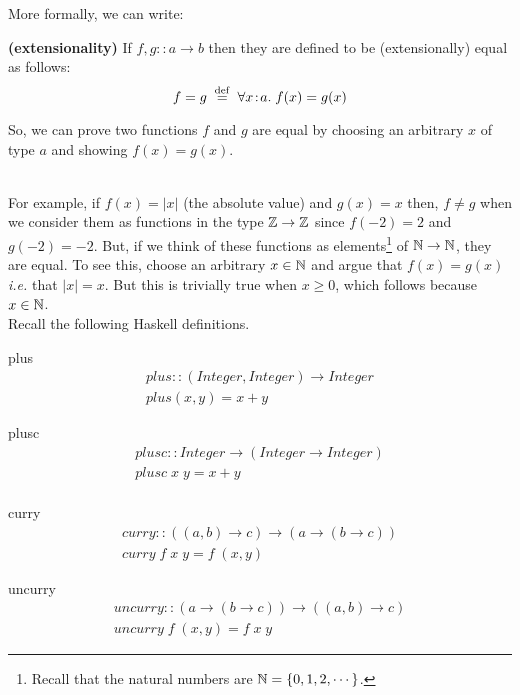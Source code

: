 \documentclass[11pt]{article}
\begin{document}
More formally, we can write:
\begin{definition}{{\bf{(extensionality)}}}
If $f,g::a\rightarrow{}b$ then they are defined to be (extensionally) equal as follows:
\[ f = g \; \;{\stackrel{\rm def}{=}}\;\; \forall{}x\!:\!a.\; f(x) = g(x) \]
\end{definition}

So, we can prove two functions $f$ and $g$ are equal by choosing an arbitrary
$x$ of type $a$ and showing $f(x) = g(x)$.

\ \\ For example, if $f(x) = |x|$ (the absolute value) and $g(x) = x$ then,
$f\not={}g$ when we consider them as functions in the type ${\mathbb{Z}} \rightarrow
{\mathbb{Z}}$ since $f(-2) = 2$ and $g(-2)=-2$.  But, if we think of these functions as
elements\footnote{Recall that the natural numbers are
${\mathbb{N}}=\{0,1,2,\cdots\}$.} of ${\mathbb{N}}\rightarrow{\mathbb{N}}$, they are equal.  To see
this, choose an arbitrary $x\in{\mathbb{N}}$ and argue that $f(x) = g(x)$ {\em{i.e.}}
that $|x|=x$.  But this is trivially true when $x \ge 0$, which follows because
$x\in{\mathbb{N}}$.  \ \\

Recall the following Haskell definitions.
\begin{definition}{plus}
\[\begin{array}{l}
plus :: (Integer,Integer) \rightarrow Integer \\
plus(x,y) = x + y 
\end{array}\]
\end{definition}


\begin{definition}{plusc}
\[\begin{array}{l}
plusc :: Integer \rightarrow (Integer \rightarrow Integer) \\
plusc \; x \; y = x + y \\
\end{array}\]
\end{definition}

\begin{definition}{curry}
\[\begin{array}{l}
curry :: ((a,b) \rightarrow c) \rightarrow (a \rightarrow (b \rightarrow c))\\
curry\; f\; x\; y = f\; (x,y) 
\end{array}\]
\end{definition}

\begin{definition}{uncurry}
\[\begin{array}{l}
uncurry :: (a \rightarrow (b \rightarrow c)) \rightarrow ((a,b) \rightarrow c) \\
uncurry \;f\; (x,y) = f\; x\; y 
\end{array}\]
\end{definition}
\end{document}
